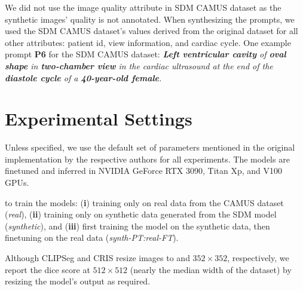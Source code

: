 \documentclass[runningheads]{llncs}
\begin{document}
We did not use the image quality attribute in SDM CAMUS dataset as the synthetic images' quality is not annotated.
When synthesizing the prompts, we used the SDM CAMUS dataset's values derived from the original dataset for all other attributes: patient id, view information, and cardiac cycle.
One example prompt \textbf{P6} for the SDM CAMUS dataset: \textit{\textbf{Left ventricular cavity} of \textbf{oval shape} in \textbf{two-chamber view} in the cardiac ultrasound at the end of the \textbf{diastole cycle} of a \textbf{40-year-old female}.}

\section{Experimental Settings}
\label{sec:experimental_settings}

Unless specified, we use the default set of parameters mentioned in the original implementation by the respective authors for all experiments.
The models are finetuned and inferred in NVIDIA GeForce RTX 3090, Titan Xp, and V100 GPUs.


 to train the models: (\textbf{i}) training only on real data from the CAMUS dataset (\textit{real}), (\textbf{ii}) training only on synthetic data generated from the SDM model (\textit{synthetic}), and (\textbf{iii}) first training the model on the synthetic data, then finetuning on the real data (\textit{synth-PT:real-FT}).

Although CLIPSeg and CRIS resize images to  and $352 \times 352$, respectively, we report the dice score at $512 \times 512$ (nearly the median width of the dataset) by resizing the model's output as required.
\end{document}
